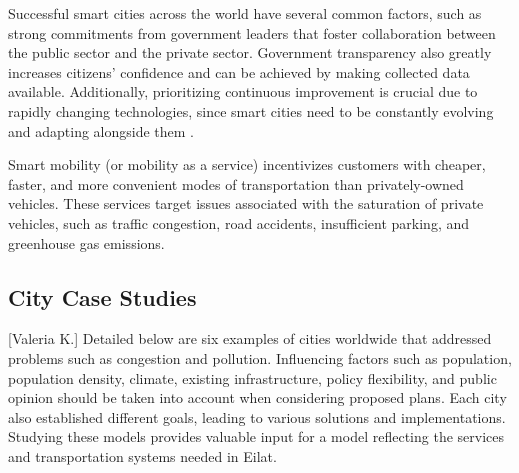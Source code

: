 \documentclass[12pt]{article}                               %
\begin{document}
Successful smart cities across the world have several common factors, such as strong commitments from government leaders that foster collaboration between the public sector and the private sector. Government transparency also greatly increases citizens' confidence and can be achieved by making collected data available. Additionally, prioritizing continuous improvement is crucial due to rapidly changing technologies, since smart cities need to be constantly evolving and adapting alongside them \cite{Zanghi2017WhyExamples}. 

Smart mobility (or mobility as a service) incentivizes customers with cheaper, faster, and more convenient modes of transportation than privately-owned vehicles. These services target issues associated with the saturation of private vehicles, such as traffic congestion, road accidents, insufficient parking, and greenhouse gas emissions.

\subsection{City Case Studies}[Valeria K.]
Detailed below are six examples of cities worldwide that addressed problems such as congestion and pollution. Influencing factors such as population, population density, climate, existing infrastructure, policy flexibility, and public opinion should be taken into account when considering proposed plans. Each city also established different goals, leading to various solutions and implementations. Studying these models provides valuable input for a model reflecting the services and transportation systems needed in Eilat.
\end{document}
